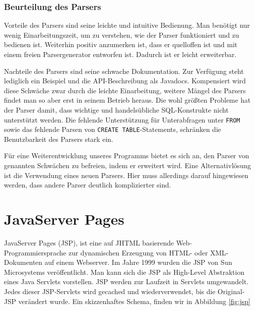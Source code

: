 \subsubsection*{Beurteilung des Parsers}

Vorteile des Parsers sind seine leichte und intuitive Bedienung. Man benötigt nur wenig Einarbeitungszeit, um zu verstehen, wie der Parser funktioniert und zu bedienen ist. Weiterhin positiv anzumerken ist, dass er quelloffen ist und mit einem freien Parsergenerator \cite{javacc1} entworfen ist. Dadurch ist er leicht erweiterbar.

Nachteile des Parsers sind seine schwache Dokumentation. Zur Verfügung steht lediglich ein Beispiel und die API-Beschreibung als Javadocs. Kompensiert wird diese Schwäche zwar durch die leichte Einarbeitung, weitere Mängel des Parsers findet man so aber erst in seinem Betrieb heraus. Die wohl größten Probleme hat der Parser damit, dass wichtige und handelsübliche SQL-Konstrukte nicht unterstützt werden. Die fehlende Unterstützung für Unterabfragen unter \verb|FROM| sowie das fehlende Parsen von \verb|CREATE TABLE|-Statements, schränken die Benutzbarkeit des Parsers stark ein. 

Für eine Weiterentwicklung unseres Programms bietet es sich an, den Parser von genannten Schwächen zu befreien, indem er erweitert wird. Eine Alternativlösung ist die Verwendung eines neuen Parsers. Hier muss allerdings darauf hingewiesen werden, dass andere Parser deutlich komplizierter sind.


\section{JavaServer Pages}

JavaServer Pages (JSP), ist eine auf JHTML basierende Web-Programmiersprache zur dynamischen Erzeugung von HTML- oder XML-Dokumenten auf einem Webserver. Im Jahre 1999 wurden die JSP von Sun Microsystems veröffentlicht. Man kann sich die JSP als High-Level Abstraktion eines Java Servlets vorstellen. JSP werden zur Laufzeit in Servlets umgewandelt. Jedes dieser JSP-Servlets wird gecached und wiederverwendet, bis die Original-JSP verändert wurde. Ein skizzenhaftes Schema, finden wir in Abbildung \ref{fig:jsp}


